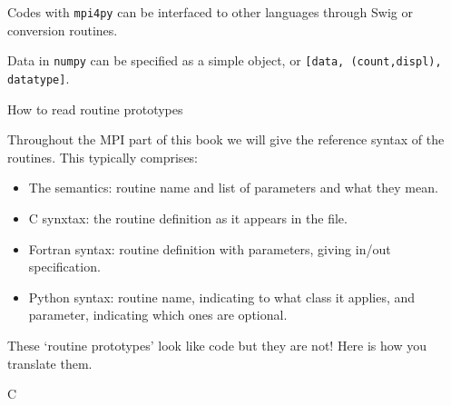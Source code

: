 Codes with \texttt{mpi4py} can be interfaced to other languages
through Swig or conversion routines.

Data in \texttt{numpy} can be specified as a simple object,
or \texttt{[data, (count,displ), datatype]}.


 {How to read routine prototypes}
\label{sec:protos}

Throughout the MPI part of this book we will give the reference syntax
of the routines. This typically comprises:
\begin{itemize}
\item The semantics: routine name and list of parameters and what they
  mean.
\item C synxtax: the routine definition as it appears in the
   file.
\item Fortran syntax: routine definition with parameters, giving
  in/out specification.
\item Python syntax: routine name, indicating to what class it
  applies, and parameter, indicating which ones are optional.
\end{itemize}

These `routine prototypes' look like code but they are not! Here is
how you translate them.

 {C}

